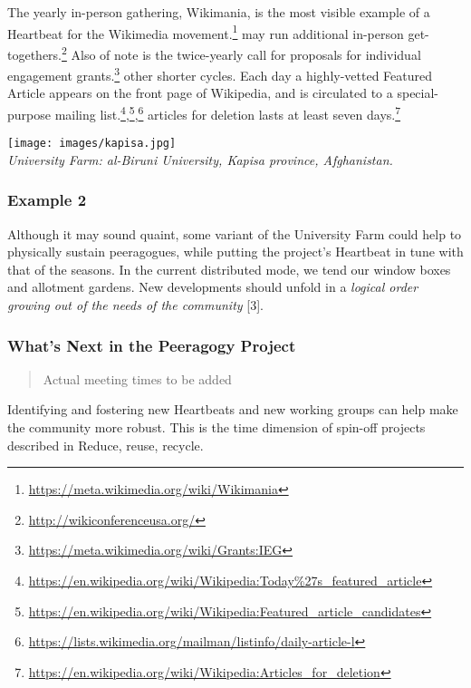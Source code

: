 The yearly in-person gathering, Wikimania, is the most visible example
of a {{Heartbeat}} for the Wikimedia movement.\footnote{\url{https://meta.wikimedia.org/wiki/Wikimania}}
may run additional in-person get-togethers.\footnote{\url{http://wikiconferenceusa.org/}}
Also of note is the twice-yearly call for proposals for individual
engagement grants.\footnote{\url{https://meta.wikimedia.org/wiki/Grants:IEG}}
other shorter cycles. Each day a highly-vetted Featured Article appears
on the front page of Wikipedia, and is circulated to a special-purpose
mailing list.\footnote{\url{https://en.wikipedia.org/wiki/Wikipedia:Today\%27s_featured_article}},\footnote{\url{https://en.wikipedia.org/wiki/Wikipedia:Featured_article_candidates}},\footnote{\url{https://lists.wikimedia.org/mailman/listinfo/daily-article-l}}
articles for deletion lasts at least seven days.\footnote{\url{https://en.wikipedia.org/wiki/Wikipedia:Articles_for_deletion}}

\texttt{[image: images/kapisa.jpg]}\\
\emph{University Farm: al-Biruni University, Kapisa province,
Afghanistan.}

\hypertarget{example-2}{%
\subsubsection{Example 2}\label{example-2}}

Although it may sound quaint, some variant of the University Farm could
help to physically sustain peeragogues, while putting the project's
{{Heartbeat}} in tune with that of the seasons. In the current
distributed mode, we tend our window boxes and allotment gardens. New
developments should unfold in a \emph{logical order growing out of the
needs of the community} {{[}3{]}}.

\hypertarget{whats-next-in-the-peeragogy-project}{%
\subsubsection{What's Next in the Peeragogy
Project}\label{whats-next-in-the-peeragogy-project}}

\begin{quote}
Actual meeting times to be added
\end{quote}

Identifying and fostering new {{Heartbeats}} and new working groups can
help make the community more robust. This is the time dimension of
spin-off projects described in {{Reduce, reuse, recycle}}.

